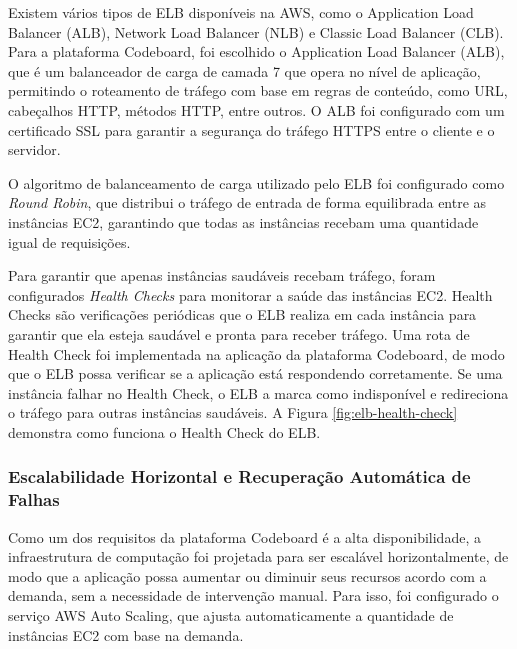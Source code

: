Existem vários tipos de ELB disponíveis na AWS, como o Application Load Balancer (ALB), Network Load Balancer (NLB) e Classic Load Balancer (CLB). Para a plataforma Codeboard, foi escolhido o Application Load Balancer (ALB), que é um balanceador de carga de camada 7 que opera no nível de aplicação, permitindo o roteamento de tráfego com base em regras de conteúdo, como URL, cabeçalhos HTTP, métodos HTTP, entre outros. O ALB foi configurado com um certificado SSL para garantir a segurança do tráfego HTTPS entre o cliente e o servidor.

O algoritmo de balanceamento de carga utilizado pelo ELB foi configurado como \emph{Round Robin}, que distribui o tráfego de entrada de forma equilibrada entre as instâncias EC2, garantindo que todas as instâncias recebam uma quantidade igual de requisições. 

Para garantir que apenas instâncias saudáveis recebam tráfego, foram configurados \emph{Health Checks} para monitorar a saúde das instâncias EC2. Health Checks são verificações periódicas que o ELB realiza em cada instância para garantir que ela esteja saudável e pronta para receber tráfego. Uma rota de Health Check foi implementada na aplicação da plataforma Codeboard, de modo que o ELB possa verificar se a aplicação está respondendo corretamente. Se uma instância falhar no Health Check, o ELB a marca como indisponível e redireciona o tráfego para outras instâncias saudáveis. A Figura \ref{fig:elb-health-check} demonstra como funciona o Health Check do ELB.


\subsubsection{Escalabilidade Horizontal e Recuperação Automática de Falhas}

Como um dos requisitos da plataforma Codeboard é a alta disponibilidade, a infraestrutura de computação foi projetada para ser escalável horizontalmente, de modo que a aplicação possa aumentar ou diminuir seus recursos acordo com a demanda, sem a necessidade de intervenção manual. Para isso, foi configurado o serviço AWS Auto Scaling, que ajusta automaticamente a quantidade de instâncias EC2 com base na demanda.

